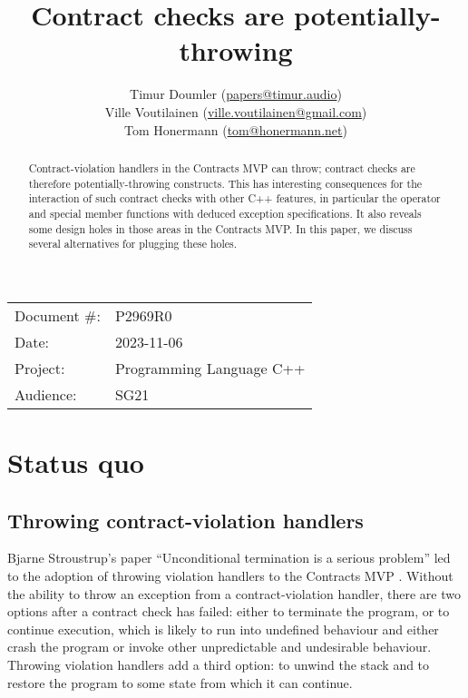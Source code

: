 


\title{Contract checks are potentially-throwing}
\author{ Timur Doumler \small(\href{mailto:papers@timur.audio}{papers@timur.audio}) \\
Ville Voutilainen \small(\href{mailto:ville.voutilainen@gmail.com}{ville.voutilainen@gmail.com}) \\
Tom Honermann \small(\href{mailto:tom@honermann.net}{tom@honermann.net})
}
\date{}
\maketitle


\begin{tabular}{ll}
Document \#: & P2969R0 \\
Date: &2023-11-06 \\
Project: & Programming Language C++ \\
Audience: & SG21
\end{tabular}

\begin{abstract}
Contract-violation handlers in the Contracts MVP can throw; contract checks are therefore potentially-throwing constructs. This has interesting consequences for the interaction of such contract checks with other C++ features, in particular the  operator and special member functions with deduced exception specifications. It also reveals some design holes in those areas in the Contracts MVP. In this paper, we discuss several alternatives for plugging these holes.
\end{abstract}



\section{Status quo}
\subsection{Throwing contract-violation handlers}

Bjarne Stroustrup's paper ``Unconditional termination is a serious problem'' \cite{P2698R0} led to the adoption of throwing violation handlers to the Contracts MVP \cite{P2900R1}. Without the ability to throw an exception from a contract-violation handler, there are two options after a contract check has failed: either to terminate the program, or to continue execution, which is likely to run into undefined behaviour and either crash the program or invoke other unpredictable and undesirable behaviour. Throwing violation handlers add a third option: to unwind the stack and to restore the program to some state from which it can continue.

